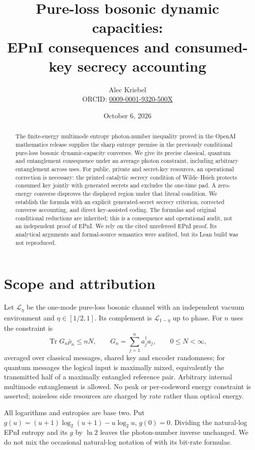 \documentclass[11pt]{article}
\title{Pure-loss bosonic dynamic capacities:\\EPnI consequences and consumed-key secrecy accounting}
\author{Alec Kriebel\\\small ORCID: \href{https://orcid.org/0009-0001-9320-500X}{0009-0001-9320-500X}}
\date{October 6, 2026}
\newcommand{\Tr}{\operatorname{Tr}}
\newcommand{\Loss}{\mathcal L}
\begin{document}
\maketitle
\begin{abstract}
The finite-energy multimode entropy photon-number inequality proved in
the OpenAI mathematics release supplies the sharp entropy premise in the
previously conditional pure-loss bosonic dynamic-capacity converses.
We give its precise classical, quantum and entanglement consequence under an
average photon constraint, including arbitrary entanglement across uses.
For public, private and secret-key resources, an operational correction is
necessary: the printed catalytic secrecy condition of Wilde--Hsieh
protects consumed key jointly with generated secrets and excludes the
one-time pad. A zero-energy converse disproves the displayed region
under that literal condition. We establish the formula with an explicit
generated-secret secrecy criterion, corrected converse accounting, and
direct key-assisted coding. The formulas and original conditional
reductions are inherited; this is a consequence and operational audit,
not an independent proof of EPnI. We rely on the cited unrefereed EPnI
proof. Its analytical arguments and formal-source semantics were
audited, but its Lean build was not reproduced.
\end{abstract}

\section{Scope and attribution}
Let $\Loss_\eta$ be the one-mode pure-loss bosonic channel with an
independent vacuum environment and $\eta\in[1/2,1]$.
Its complement is $\Loss_{1-\eta}$ up to phase. For $n$ uses the
constraint is
\begin{equation}\label{energy}
 \Tr G_n\bar\rho_n\le nN,\qquad
 G_n=\sum_{j=1}^n a_j^\dagger a_j,\qquad 0\le N<\infty,
\end{equation}
averaged over classical messages, shared key and encoder randomness;
for quantum messages the logical input is maximally mixed, equivalently
the transmitted half of a maximally entangled reference pair. Arbitrary
internal multimode entanglement is allowed. No peak or per-codeword
energy constraint is asserted; noiseless side resources are charged by
rate rather than optical energy.

All logarithms and entropies are base two. Put
$g(u)=(u+1)\log_2(u+1)-u\log_2u$, $g(0)=0$.
Dividing the natural-log EPnI entropy and its $g$ by $\ln2$ leaves
the photon-number inverse unchanged. We do not mix the occasional
natural-log notation of \cite{WHG} with its bit-rate formulas.
\end{document}
